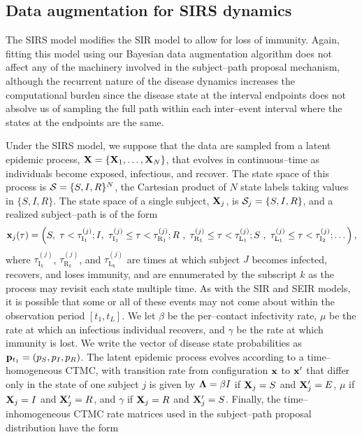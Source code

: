 \subsection{Data augmentation for SIRS dynamics}
\label{subsec:bda_sirs_model}

The SIRS model modifies the SIR model to allow for loss of immunity. Again, fitting this model using our Bayesian data augmentation algorithm does not affect any of the machinery involved in the subject--path proposal mechanism, although the recurrent nature of the disease dynamics increases the computational burden since the disease state at the interval endpoints does not absolve us of sampling the full path within each inter--event interval where the states at the endpoints are the same.

Under the SIRS model, we suppose that the data are sampled from a latent epidemic process, $ \mathbf{X} = \lbrace \mathbf{X}_1,\dots,\mathbf{X}_N\rbrace $, that evolves in continuous--time as individuals become exposed, infectious, and recover. The state space of this process is $ \mathcal{S} = \lbrace S,I,R\rbrace^N $, the Cartesian product of $ N $ state labels taking values in $ \lbrace S,I,R\rbrace $. The state space of a single subject, $ \mathbf{X}_j $, is $\mathcal{S}_j = \lbrace S, I, R\rbrace $, and a realized subject--path is of the form $$ \mathbf{x}_j(\tau) = \left (S,\ \tau < \tau^{(j)}_{\mathrm{I}_1}; 
	I,\ \tau^{(j)}_{\mathrm{I}_1} \leq \tau < \tau^{(j)}_{\mathrm{R}_1};
	R\ ,\ \tau^{(j)}_{\mathrm{R}_1} \leq \tau < \tau^{(j)}_{\mathrm{L}_1}; 
	S\ ,\ \tau^{(j)}_{\mathrm{L}_1} \leq \tau < \tau^{(j)}_{\mathrm{I}_2};\dots
	\right ), $$
where $ \tau^{(j)}_{\mathrm{I}_k} $, $ \tau^{(j)}_{\mathrm{R}_k} $, and $ \tau^{(j)}_{\mathrm{L}_k} $ are times at which subject $ J $ becomes infected, recovers, and loses immunity, and are ennumerated by the subscript $ k $ as the process may revisit each state multiple time. As with the SIR and SEIR models, it is possible that some or all of these events may not come about within the observation period $ [t_1,t_L] $. We let $ \beta $ be the per--contact infectivity rate, $ \mu $ be the rate at which an infectious individual recovers, and $ \gamma $ be the rate at which immunity is lost. We write the vector of disease state probabilities as $ \mathbf{p}_{t_1} = (p_S,p_I,p_R) $. The latent epidemic process evolves according to a time--homogeneous CTMC, with transition rate from configuration $ \mathbf{x} $ to $ \mathbf{x}^\prime $ that differ only in the state of one subject $ j $ is given by $ \boldsymbol{\Lambda} = \beta I $ if $ \mathbf{X}_j = S $ and $ \mathbf{X}^\prime_j = E$, $ \mu $ if $ \mathbf{X}_j = I $ and $ \mathbf{X}^\prime_j = R$, and $ \gamma $ if $ \mathbf{X}_j = R $ and $ \mathbf{X}^\prime_j = S$. Finally, the time--inhomogeneous CTMC rate matrices used in the subject--path proposal distribution have the form
